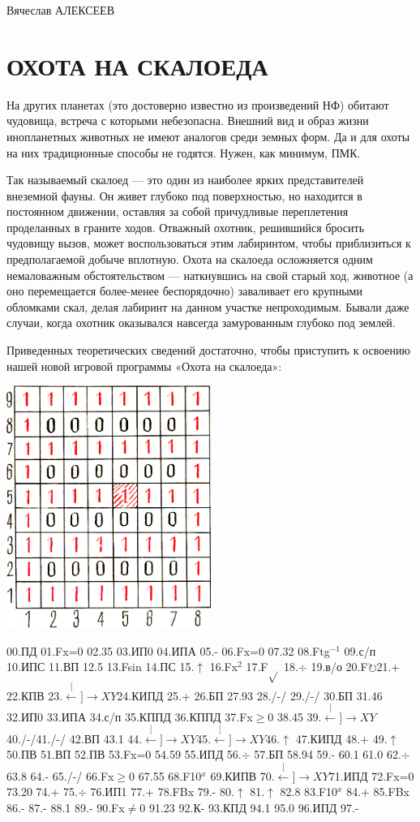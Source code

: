 \documentclass[11pt,a4paper,oneside]{article}
\def\XY{$\stackrel[\leftarrow]{\rightarrow}{XY}$}
\def\FO{F$\circlearrowright$}
\begin{document}
Вячеслав АЛЕКСЕЕВ

\section{ОХОТА НА СКАЛОЕДА}
На других планетах (это достоверно известно из произведений НФ) обитают чудовища, встреча с которыми небезопасна. Внешний вид и образ жизни инопланетных животных не имеют аналогов среди земных форм. Да и для охоты на них традиционные способы не годятся. Нужен, как минимум, ПМК.

Так называемый скалоед — это один из наиболее ярких представителей внеземной фауны. Он живет глубоко под поверхностью, но находится в постоянном движении, оставляя за собой причудливые переплетения проделанных в граните ходов. Отважный охотник, решившийся бросить чудовищу вызов, может воспользоваться этим лабиринтом, чтобы приблизиться к предполагаемой добыче вплотную.
Охота на скалоеда осложняется одним немаловажным обстоятельством — наткнувшись на свой старый ход, животное (а оно перемещается более-менее беспорядочно) заваливает его крупными обломками скал, делая лабиринт на данном участке непроходимым. Бывали даже случаи, когда охотник оказывался навсегда замурованным глубоко под землей.

Приведенных теоретических сведений достаточно, чтобы приступить к освоению нашей новой игровой программы «Охота на скалоеда»:

\includegraphics[width=0.5\textwidth]{skaloed}

00.ПД 01.Fx=0 02.35 03.ИП0 04.ИПА 05.- 06.Fx=0 07.32 08.Ftg$^{-1}$ 09.с/п 10.ИПС 11.ВП 12.5 13.Fsin 14.ПС 15.$\uparrow$ 16.Fx$^{2}$
17.F$\sqrt{}$ 18.$\div$ 19.в/о 20.\FO 21.+ 22.КПВ 23.\XY 24.КИПД 25.+ 26.БП 27.93 28./-/ 29./-/ 30.БП 31.46 32.ИП0 33.ИПА 34.с/п 35.КППД 36.КППД 37.Fx$\geq$0 38.45 39.\XY 40./-/41./-/
42.ВП 43.1 44.\XY 45.\XY 46.$\uparrow$ 47.КИПД 48.+ 49.$\uparrow$ 50.ПВ 51.ВП 52.ПВ 53.Fx=0 54.59 55.ИПД 56.$\div$ 57.БП 58.94 59.- 60.1 61.0 62.$\div$ 63.8 64.- 65./-/ 66.Fx$\geq$0 67.55 68.F10$^{x}$ 69.КИПВ 70.\XY 71.ИПД 72.Fx=0 73.20
74.+ 75.$\div$ 76.ИП1 77.+ 78.FBx 79.- 80.$\uparrow$ 81.$\uparrow$ 82.8 83.F10$^{x}$ 84.+ 85.FBx 86.- 87.- 88.1 89.- 90.Fx$\neq$0 91.23 92.К- 93.КПД 94.1 95.0 96.ИПД 97.-
\end{document}
